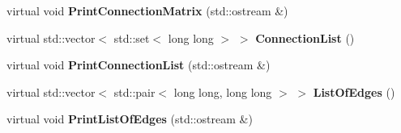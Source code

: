 \begin{DoxyCompactItemize}
\item 
\mbox{\label{class_graph_a44b547d4833a2a438a3a337272dcd34f}} 
virtual void {\bfseries Print\+Connection\+Matrix} (std\+::ostream \&)
\item 
\mbox{\label{class_graph_a212f24e509217c2e7656afa52b9c2044}} 
virtual std\+::vector$<$ std\+::set$<$ long long $>$ $>$ {\bfseries Connection\+List} ()
\item 
\mbox{\label{class_graph_a5f1a00ca16069a04c2d2e3c8cf79a942}} 
virtual void {\bfseries Print\+Connection\+List} (std\+::ostream \&)
\item 
\mbox{\label{class_graph_a7f715bb067cbac08145362cf792e2f96}} 
virtual std\+::vector$<$ std\+::pair$<$ long long, long long $>$ $>$ {\bfseries List\+Of\+Edges} ()
\item 
\mbox{\label{class_graph_ac43adf725cee04e777c2931a2a7a9ba3}} 
virtual void {\bfseries Print\+List\+Of\+Edges} (std\+::ostream \&)
\end{DoxyCompactItemize}
